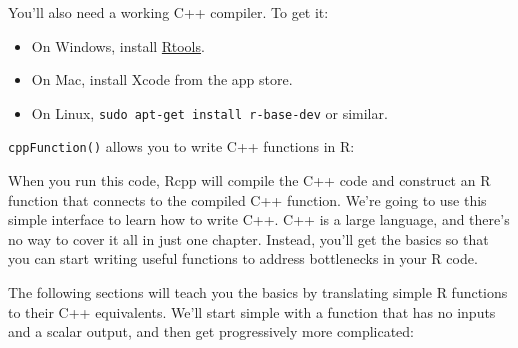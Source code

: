 You'll also need a working C++ compiler. To get it:

\begin{itemize}
\itemsep1pt\parskip0pt
\item
  On Windows, install
  \href{http://cran.r-project.org/bin/windows/Rtools/}{Rtools}.
\item
  On Mac, install Xcode from the app store.
\item
  On Linux, \texttt{sudo apt-get install r-base-dev} or similar.
\end{itemize}


\texttt{cppFunction()} allows you to write C++ functions in R:

\begin{Shaded}
\begin{Highlighting}[]
\CommentTok{#> }
\CommentTok{#> }
\CommentTok{#> }
\NormalTok{(}
\NormalTok{)}
\NormalTok{(}\NormalTok{, }\NormalTok{, }\NormalTok{)}
\end{Highlighting}
\end{Shaded}

When you run this code, Rcpp will compile the C++ code and construct an
R function that connects to the compiled C++ function. We're going to
use this simple interface to learn how to write C++. C++ is a large
language, and there's no way to cover it all in just one chapter.
Instead, you'll get the basics so that you can start writing useful
functions to address bottlenecks in your R code.

The following sections will teach you the basics by translating simple R
functions to their C++ equivalents. We'll start simple with a function
that has no inputs and a scalar output, and then get progressively more
complicated:

